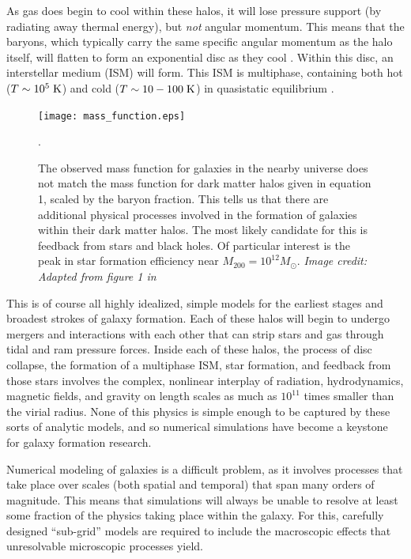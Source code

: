 As gas does begin to cool within these halos, it will lose pressure support (by
radiating away thermal energy), but {\it not} angular momentum.  This means that
the baryons, which typically carry the same specific angular momentum as the
halo itself, will flatten to form an exponential disc as they cool
\citep{Fall1980,Mo1998}.  Within this disc, an interstellar medium (ISM) will form.  This
ISM is multiphase, containing both hot ($T\sim10^5\;\rm{K}$) and cold
($T\sim10-100\;\rm{K}$) in quasistatic equilibrium \citep{McKee1977}.
\begin{figure}
    \texttt{[image: mass\_function.eps]}
    \caption[Galaxy mass function]{The observed mass function for galaxies in
    the nearby universe does not match the mass function for dark matter halos
    given in equation 1, scaled by the baryon fraction.  This tells us that
    there are additional physical processes involved in the formation of
    galaxies within their dark matter halos.  The most likely candidate for
    this is feedback from stars and black holes.  Of particular interest is the
    peak in star formation efficiency near $M_{200}=10^{12}M_\odot$.
    \textit{Image credit: Adapted from figure 1 in \citet{Ferrero2012}}}.
\end{figure}

This is of course all highly idealized, simple models for the earliest stages
and broadest strokes of galaxy formation.  Each of these halos will begin to
undergo mergers and interactions with each other that can strip stars and gas
through tidal and ram pressure forces.  Inside each of these halos, the process
of disc collapse, the formation of a multiphase ISM, star
formation, and feedback from those stars involves the complex, nonlinear
interplay of radiation, hydrodynamics, magnetic fields, and gravity on length
scales as much as $10^{11}$ times smaller than the virial radius.  None of this
physics is simple enough to be captured by these sorts of analytic models, and
so numerical simulations have become a keystone for galaxy formation research.

Numerical modeling of galaxies is a difficult problem, as it involves processes
that take place over scales (both spatial and temporal) that span many orders of
magnitude.  This means that simulations will always be unable to resolve at
least some fraction of the physics taking place within the galaxy.  For this,
carefully designed ``sub-grid'' models are required to include the macroscopic
effects that unresolvable microscopic processes yield. 

